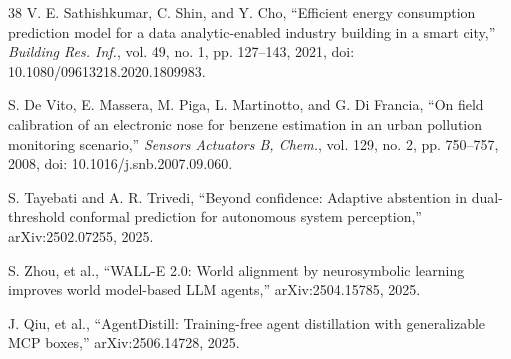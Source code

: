 \documentclass[review]{elsarticle}
\begin{document}
\begin{thebibliography}{38}
 V. E. Sathishkumar, C. Shin, and Y. Cho, ``Efficient energy
consumption prediction model for a data analytic-enabled industry building in
a smart city,'' \emph{Building Res. Inf.}, vol. 49, no. 1, pp. 127--143,
2021, doi: 10.1080/09613218.2020.1809983.

 S. De Vito, E. Massera, M. Piga, L. Martinotto, and G. Di
Francia, ``On field calibration of an electronic nose for benzene estimation
in an urban pollution monitoring scenario,'' \emph{Sensors Actuators B,
Chem.}, vol. 129, no. 2, pp. 750--757, 2008, doi: 10.1016/j.snb.2007.09.060.

 S. Tayebati and A. R. Trivedi, ``Beyond confidence: Adaptive
abstention in dual-threshold conformal prediction for autonomous system
perception,'' arXiv:2502.07255, 2025.

 S. Zhou, et al., ``WALL-E 2.0: World alignment by neurosymbolic
learning improves world model-based LLM agents,'' arXiv:2504.15785, 2025.

 J. Qiu, et al., ``AgentDistill: Training-free agent distillation
with generalizable MCP boxes,'' arXiv:2506.14728, 2025.

\end{thebibliography}
\end{document}

